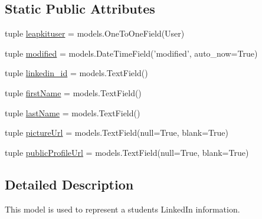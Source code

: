 \subsection*{Static Public Attributes}
\begin{DoxyCompactItemize}
\item 
tuple \hyperlink{classstudents_1_1models_1_1_linked_in_profile_ac0b6bb95d0354a37b69a74c261ee67cb}{leapkituser} = models.\-One\-To\-One\-Field(User)
\item 
tuple \hyperlink{classstudents_1_1models_1_1_linked_in_profile_a5a40a9ab44852b841f9ec30b5351b46f}{modified} = models.\-Date\-Time\-Field('modified', auto\-\_\-now=True)
\item 
tuple \hyperlink{classstudents_1_1models_1_1_linked_in_profile_a9ec9270281a1ed7cc744f3a027dbdc01}{linkedin\-\_\-id} = models.\-Text\-Field()
\item 
tuple \hyperlink{classstudents_1_1models_1_1_linked_in_profile_a8fedcda58ba560b252b16404f83feb5e}{first\-Name} = models.\-Text\-Field()
\item 
tuple \hyperlink{classstudents_1_1models_1_1_linked_in_profile_ad8ce210760752fd163191757482008bc}{last\-Name} = models.\-Text\-Field()
\item 
tuple \hyperlink{classstudents_1_1models_1_1_linked_in_profile_aa6723daf0868233192944d27c627a0be}{picture\-Url} = models.\-Text\-Field(null=True, blank=True)
\item 
tuple \hyperlink{classstudents_1_1models_1_1_linked_in_profile_a4ca4e96f931603cea56405a4c6ca2c31}{public\-Profile\-Url} = models.\-Text\-Field(null=True, blank=True)
\end{DoxyCompactItemize}


\subsection{Detailed Description}
\begin{DoxyVerb}This model is used to represent a students LinkedIn information.
\end{DoxyVerb}
 


